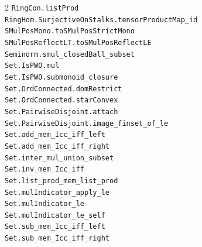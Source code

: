 \documentclass[10pt,a4paper]{article}
\begin{document}
\begin{multicols}{2}
\texttt{RingCon.\allowbreak{}listProd} \\
\texttt{RingHom.\allowbreak{}SurjectiveOnStalks.\allowbreak{}tensorProductMap\_id} \\
\texttt{SMulPosMono.\allowbreak{}toSMulPosStrictMono} \\
\texttt{SMulPosReflectLT.\allowbreak{}toSMulPosReflectLE} \\
\texttt{Seminorm.\allowbreak{}smul\_closedBall\_subset} \\
\texttt{Set.\allowbreak{}IsPWO.\allowbreak{}mul} \\
\texttt{Set.\allowbreak{}IsPWO.\allowbreak{}submonoid\_closure} \\
\texttt{Set.\allowbreak{}OrdConnected.\allowbreak{}domRestrict} \\
\texttt{Set.\allowbreak{}OrdConnected.\allowbreak{}starConvex} \\
\texttt{Set.\allowbreak{}PairwiseDisjoint.\allowbreak{}attach} \\
\texttt{Set.\allowbreak{}PairwiseDisjoint.\allowbreak{}image\_finset\_of\_le} \\
\texttt{Set.\allowbreak{}add\_mem\_Icc\_iff\_left} \\
\texttt{Set.\allowbreak{}add\_mem\_Icc\_iff\_right} \\
\texttt{Set.\allowbreak{}inter\_mul\_union\_subset} \\
\texttt{Set.\allowbreak{}inv\_mem\_Icc\_iff} \\
\texttt{Set.\allowbreak{}list\_prod\_mem\_list\_prod} \\
\texttt{Set.\allowbreak{}mulIndicator\_apply\_le} \\
\texttt{Set.\allowbreak{}mulIndicator\_le} \\
\texttt{Set.\allowbreak{}mulIndicator\_le\_self} \\
\texttt{Set.\allowbreak{}sub\_mem\_Icc\_iff\_left} \\
\texttt{Set.\allowbreak{}sub\_mem\_Icc\_iff\_right} \\

\end{multicols}
\end{document}
